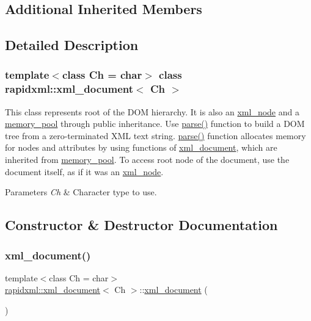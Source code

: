 \subsection*{Additional Inherited Members}


\subsection{Detailed Description}
\subsubsection*{template$<$class Ch = char$>$\newline
class rapidxml\+::xml\+\_\+document$<$ Ch $>$}

This class represents root of the D\+OM hierarchy. It is also an \mbox{\hyperlink{classrapidxml_1_1xml__node}{xml\+\_\+node}} and a \mbox{\hyperlink{classrapidxml_1_1memory__pool}{memory\+\_\+pool}} through public inheritance. Use \mbox{\hyperlink{classrapidxml_1_1xml__document_ac6e73ff9ac323bf5a370c38feb03a6b1}{parse()}} function to build a D\+OM tree from a zero-\/terminated X\+ML text string. \mbox{\hyperlink{classrapidxml_1_1xml__document_ac6e73ff9ac323bf5a370c38feb03a6b1}{parse()}} function allocates memory for nodes and attributes by using functions of \mbox{\hyperlink{classrapidxml_1_1xml__document}{xml\+\_\+document}}, which are inherited from \mbox{\hyperlink{classrapidxml_1_1memory__pool}{memory\+\_\+pool}}. To access root node of the document, use the document itself, as if it was an \mbox{\hyperlink{classrapidxml_1_1xml__node}{xml\+\_\+node}}. 
\begin{DoxyParams}{Parameters}
{\em Ch} & Character type to use. \\
\hline
\end{DoxyParams}


\subsection{Constructor \& Destructor Documentation}
\mbox{\label{classrapidxml_1_1xml__document_aae8841b15085ba8f32ff46587ace28f5}} 
\subsubsection{\texorpdfstring{xml\+\_\+document()}{xml\_document()}\hspace{0.1cm}{\footnotesize\ttfamily [1/2]}}
{\footnotesize\ttfamily template$<$class Ch  = char$>$ \\
\mbox{\hyperlink{classrapidxml_1_1xml__document}{rapidxml\+::xml\+\_\+document}}$<$ Ch $>$\+::\mbox{\hyperlink{classrapidxml_1_1xml__document}{xml\+\_\+document}} (\begin{DoxyParamCaption}{ }\end{DoxyParamCaption})\hspace{0.3cm}{\ttfamily [inline]}}



